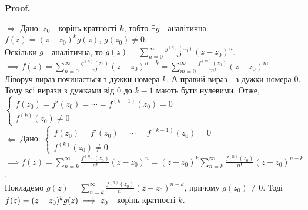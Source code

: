 \documentclass[a4paper, 10pt]{article}
\makeatletter
\def\hugespace{\vspace{5mm} \\}
\def\qed{$\blacksquare$}
\theoremstyle{theoremdd}
\theoremstyle{theoremdd}
\theoremstyle{theoremdd}
\theoremstyle{theoremdd}
\theoremstyle{theoremdd}
\theoremstyle{theoremdd}
\theoremstyle{theoremdd}
\theoremstyle{theoremdd}
\renewenvironment{proof}[1][Proof.\\]{\par
\pushQED{\hfill \qed}%
\normalfont \topsep6\p@\@plus6\p@\relax
\trivlist
\item\relax
{\bfseries
#1\@addpunct{.}}\hspace\labelsep\ignorespaces
}{%
\popQED\endtrivlist\@endpefalse
}
\makeatother
\begin{document}
\begin{proof}
	$\boxed{\Rightarrow}$ Дано: $z_0$ - корінь кратності $k$, тобто $\exists g$ - аналітична: $f(z)=(z-z_0)^k g(z)$, $g(z_0) \neq 0$.\\
	Оскільки $g$ - аналітична, то $\displaystyle g(z) = \sum_{n=0}^{\infty} \frac{g^{(n)}(z_0)}{n!} (z-z_0)^n$.\\
	$\implies \displaystyle f(z) = \sum_{n=0}^{\infty} \frac{g^{(n)}(z_0)}{n!} (z-z_0)^{n+k} = \sum_{m=0}^{\infty} \frac{f^{(m)}(z_0)}{m!} (z-z_0)^{m}$.\\
	Ліворуч вираз починається з дужки номера $k$. А правий вираз - з дужки номера $0$. Тому всі вирази з дужками від $0$ до $k-1$ мають бути нулевими. Отже,\\
	$\begin{cases} 
	f(z_0)=f'(z_0)=\cdots=f^{(k-1)}(z_0) = 0\\
	f^{(k)}(z_0) \neq 0
	\end{cases}$
	\hugespace
	$\boxed{\Leftarrow}$ Дано: $\begin{cases} 
	f(z_0)=f'(z_0)=\cdots=f^{(k-1)}(z_0) = 0\\
	f^{(k)}(z_0) \neq 0
	\end{cases}$\\
	$\implies \displaystyle f(z) = \sum_{n=k}^{\infty} \frac{f^{(n)}(z_0)}{n!} (z-z_0)^{n}= (z-z_0)^{k} \sum_{n=k}^{\infty} \frac{f^{(n)}(z_0)}{n!} (z-z_0)^{n-k}$.\\
	Покладемо $\displaystyle g(z) = \sum_{n=k}^{\infty} \frac{f^{(n)}(z_0)}{n!} (z-z_0)^{n-k}$, причому $g(z_0) \neq 0$. Тоді $f(z)=(z-z_0)^k g(z) \\ \implies z_0$ - корінь кратності $k$.
\end{proof}
	
\end{document}
